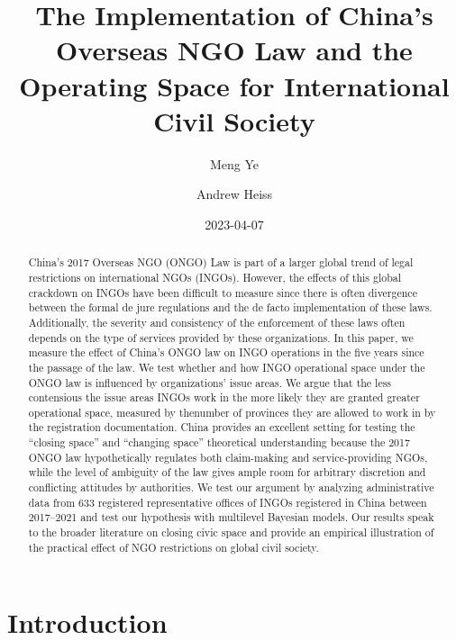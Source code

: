 \documentclass[
]{article}
\title{The Implementation of China's Overseas NGO Law and the Operating
Space for International Civil Society}
\author{Meng Ye \and Andrew Heiss}
\date{2023-04-07}
\begin{document}
\maketitle
\begin{abstract}
China's 2017 Overseas NGO (ONGO) Law is part of a larger global trend of
legal restrictions on international NGOs (INGOs). However, the effects
of this global crackdown on INGOs have been difficult to measure since
there is often divergence between the formal de jure regulations and the
de facto implementation of these laws. Additionally, the severity and
consistency of the enforcement of these laws often depends on the type
of services provided by these organizations. In this paper, we measure
the effect of China's ONGO law on INGO operations in the five years
since the passage of the law. We test whether and how INGO operational
space under the ONGO law is influenced by organizations' issue areas. We
argue that the less contensious the issue areas INGOs work in the more
likely they are granted greater operational space, measured by thenumber
of provinces they are allowed to work in by the registration
documentation. China provides an excellent setting for testing the
``closing space'' and ``changing space'' theoretical understanding
because the 2017 ONGO law hypothetically regulates both claim-making and
service-providing NGOs, while the level of ambiguity of the law gives
ample room for arbitrary discretion and conflicting attitudes by
authorities. We test our argument by analyzing administrative data from
633 registered representative offices of INGOs registered in China
between 2017--2021 and test our hypothesis with multilevel Bayesian
models. Our results speak to the broader literature on closing civic
space and provide an empirical illustration of the practical effect of
NGO restrictions on global civil society.
\end{abstract}
\ifdefined\Shaded\renewenvironment{Shaded}{\begin{tcolorbox}[breakable, boxrule=0pt, sharp corners, frame hidden, borderline west={3pt}{0pt}{shadecolor}, enhanced, interior hidden]}{\end{tcolorbox}}\fi

\hypertarget{introduction}{%
\section{Introduction}\label{introduction}}
\end{document}
